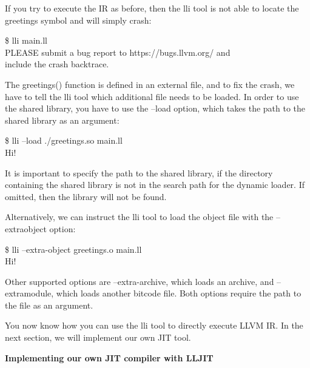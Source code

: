 If you try to execute the IR as before, then the lli tool is not able to locate the greetings symbol and will simply crash:\par

\begin{tcolorbox}[colback=white,colframe=black]
\$ lli main.ll \\
PLEASE submit a bug report to https://bugs.llvm.org/ and \\
include the crash backtrace.
\end{tcolorbox}

The greetings() function is defined in an external file, and to fix the crash, we have to tell the lli tool which additional file needs to be loaded. In order to use the shared library, you have to use the –load option, which takes the path to the shared library as an argument:\par

\begin{tcolorbox}[colback=white,colframe=black]
\$ lli –load ./greetings.so main.ll \\
Hi!
\end{tcolorbox}

It is important to specify the path to the shared library, if the directory containing the shared library is not in the search path for the dynamic loader. If omitted, then the library will not be found.\par

Alternatively, we can instruct the lli tool to load the object file with the –extraobject option:\par

\begin{tcolorbox}[colback=white,colframe=black]
\$ lli –extra-object greetings.o main.ll \\
Hi!
\end{tcolorbox}

Other supported options are –extra-archive, which loads an archive, and –extramodule, which loads another bitcode file. Both options require the path to the file as an argument.\par

You now know how you can use the lli tool to directly execute LLVM IR. In the next section, we will implement our own JIT tool.\par

\hspace*{\fill} \par %
\textbf{Implementing our own JIT compiler with LLJIT}

